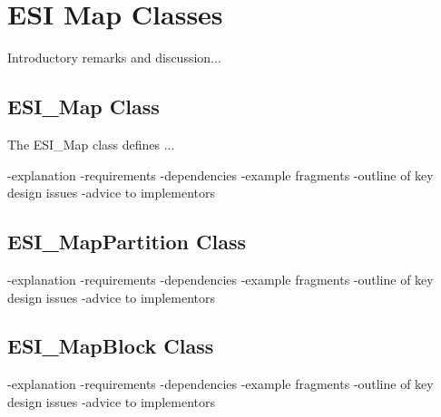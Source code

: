 \chapter{ESI Map Classes}

Introductory remarks and discussion...

\section{ESI\_Map Class}

The ESI\_Map class defines ...

-explanation
-requirements
-dependencies
-example fragments
-outline of key design issues
-advice to implementors

\section{ESI\_MapPartition Class}

-explanation
-requirements
-dependencies
-example fragments
-outline of key design issues
-advice to implementors

\section{ESI\_MapBlock Class}

-explanation
-requirements
-dependencies
-example fragments
-outline of key design issues
-advice to implementors
